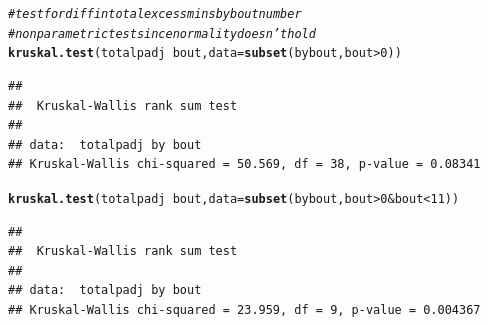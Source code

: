 \documentclass[11pt]{article}\usepackage[]{graphicx}\usepackage[]{color}
\makeatletter
\newcommand{\hlnum}[1]{\textcolor[rgb]{0.686,0.059,0.569}{#1}}%
\newcommand{\hlcom}[1]{\textcolor[rgb]{0.678,0.584,0.686}{\textit{#1}}}%
\newcommand{\hlopt}[1]{\textcolor[rgb]{0,0,0}{#1}}%
\newcommand{\hlstd}[1]{\textcolor[rgb]{0.345,0.345,0.345}{#1}}%
\newcommand{\hlkwc}[1]{\textcolor[rgb]{0.333,0.667,0.333}{#1}}%
\newcommand{\hlkwd}[1]{\textcolor[rgb]{0.737,0.353,0.396}{\textbf{#1}}}%
\newenvironment{kframe}{%
 \def\at@end@of@kframe{}%
 \ifinner\ifhmode%
  \def\at@end@of@kframe{\end{minipage}}%
  \begin{minipage}{\columnwidth}%
 \fi\fi%
 \def\FrameCommand##1{\hskip\@totalleftmargin \hskip-\fboxsep
 \colorbox{shadecolor}{##1}\hskip-\fboxsep
     \hskip-\linewidth \hskip-\@totalleftmargin \hskip\columnwidth}%
 \MakeFramed {\advance\hsize-\width
   \@totalleftmargin\z@ \linewidth\hsize
   \@setminipage}}%
 {\par\unskip\endMakeFramed%
 \at@end@of@kframe}
\newenvironment{knitrout}{}{} %
\makeatother
\begin{document}
\begin{knitrout}
\color{fgcolor}\begin{kframe}
\begin{alltt}
\hlcom{#test for diff in total excess mins by bout number}
\hlcom{#nonparametric test since normality doesn't hold}
\hlkwd{kruskal.test}\hlstd{(totalpadj}\hlopt{~}\hlstd{bout,}\hlkwc{data}\hlstd{=}\hlkwd{subset}\hlstd{(bybout,bout}\hlopt{>}\hlnum{0}\hlstd{))}
\end{alltt}
\begin{verbatim}
## 
## 	Kruskal-Wallis rank sum test
## 
## data:  totalpadj by bout
## Kruskal-Wallis chi-squared = 50.569, df = 38, p-value = 0.08341
\end{verbatim}
\begin{alltt}
\hlkwd{kruskal.test}\hlstd{(totalpadj}\hlopt{~}\hlstd{bout,}\hlkwc{data}\hlstd{=}\hlkwd{subset}\hlstd{(bybout,bout}\hlopt{>}\hlnum{0}\hlopt{&}\hlstd{bout}\hlopt{<}\hlnum{11}\hlstd{))}
\end{alltt}
\begin{verbatim}
## 
## 	Kruskal-Wallis rank sum test
## 
## data:  totalpadj by bout
## Kruskal-Wallis chi-squared = 23.959, df = 9, p-value = 0.004367
\end{verbatim}
\end{kframe}
\end{knitrout}
\end{document}
